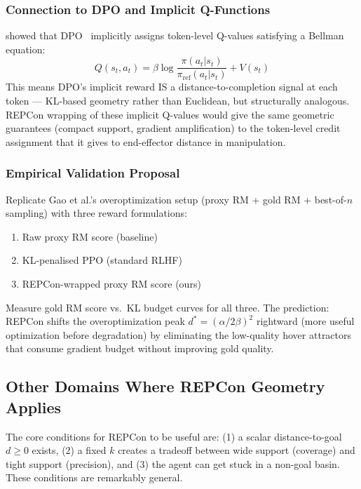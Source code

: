 \documentclass{article}
\begin{document}
\subsubsection{Connection to DPO and Implicit Q-Functions}

\citet{rafailov2024qtransform} showed that DPO~\citep{rafailov2023dpo} implicitly
assigns token-level Q-values satisfying a Bellman equation:
\begin{equation}
    Q(s_t, a_t) = \beta \log\frac{\pi(a_t|s_t)}{\pi_\text{ref}(a_t|s_t)} + V(s_t)
\end{equation}
This means DPO's implicit reward IS a distance-to-completion signal at each token ---
KL-based geometry rather than Euclidean, but structurally analogous. REPCon wrapping
of these implicit Q-values would give the same geometric guarantees (compact support,
gradient amplification) to the token-level credit assignment that it gives to
end-effector distance in manipulation.

\subsubsection{Empirical Validation Proposal}

Replicate Gao et al.'s overoptimization setup (proxy RM + gold RM + best-of-$n$
sampling) with three reward formulations:
\begin{enumerate}
    \item Raw proxy RM score (baseline)
    \item KL-penalised PPO (standard RLHF)
    \item REPCon-wrapped proxy RM score (ours)
\end{enumerate}
Measure gold RM score vs.\ KL budget curves for all three. The prediction:
REPCon shifts the overoptimization peak $d^* = (\alpha/2\beta)^2$ rightward (more
useful optimization before degradation) by eliminating the low-quality hover attractors
that consume gradient budget without improving gold quality.

\subsection{Other Domains Where REPCon Geometry Applies}
\label{app:broader}

The core conditions for REPCon to be useful are: (1) a scalar distance-to-goal
$d \geq 0$ exists, (2) a fixed $k$ creates a tradeoff between wide support
(coverage) and tight support (precision), and (3) the agent can get stuck in a
non-goal basin. These conditions are remarkably general.
\end{document}
